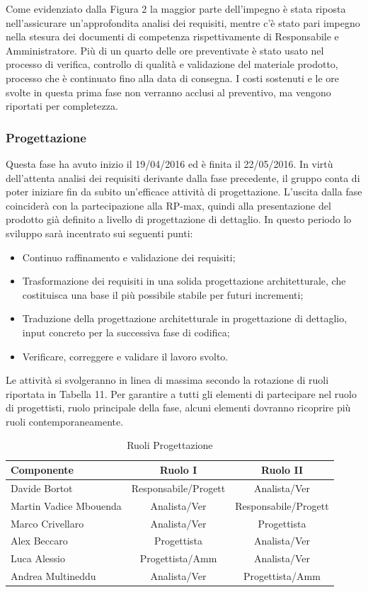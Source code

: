 \documentclass[a4paper,11pt]{article}
\begin{document}
		Come evidenziato dalla Figura 2 la maggior parte dell'impegno è stata riposta nell'assicurare un'approfondita analisi dei requisiti, mentre c'è stato pari impegno nella stesura dei documenti di competenza rispettivamente di Responsabile e Amministratore. Più di un quarto delle ore preventivate è stato usato nel processo di verifica, controllo di qualità e validazione del materiale prodotto, processo che è continuato fino alla data di consegna. I costi sostenuti e le ore svolte in questa prima fase non verranno acclusi al preventivo, ma vengono riportati per completezza.
		\pagebreak
		\subsubsection{Progettazione}
		Questa fase ha avuto inizio il 19/04/2016 ed è finita il 22/05/2016. In virtù dell'attenta analisi dei requisiti derivante dalla fase precedente, il gruppo conta di poter iniziare fin da subito un'efficace attività di progettazione. L'uscita dalla fase coinciderà con la partecipazione alla RP-max, quindi alla presentazione del prodotto già definito a livello di progettazione di dettaglio. In questo periodo lo sviluppo sarà incentrato sui seguenti punti:
		\begin{itemize}
		\item Continuo raffinamento e validazione dei requisiti;
		\item Trasformazione dei requisiti in una solida progettazione architetturale, che costituisca una base il più possibile stabile per futuri incrementi;
		\item Traduzione della progettazione architetturale in progettazione di dettaglio, input concreto per la successiva fase di codifica;
		\item Verificare, correggere e validare il lavoro svolto.
		\end{itemize}
		Le attività si svolgeranno in linea di massima secondo la rotazione di ruoli riportata in Tabella 11. Per garantire a tutti gli elementi di partecipare nel ruolo di progettisti, ruolo principale della fase, alcuni elementi dovranno ricoprire più ruoli contemporaneamente.
		\begin{table}[h!]			
		\begin{center}
			\begin{tabular}{l c c}
			\textbf{Componente} & \textbf{Ruolo I} & \textbf{Ruolo II} \\
			\midrule
			Davide Bortot & Responsabile/Progett & Analista/Ver\\
			Martin Vadice Mbouenda & Analista/Ver & Responsabile/Progett\\
			Marco Crivellaro & Analista/Ver & Progettista\\
			Alex Beccaro & Progettista & Analista/Ver\\
			Luca Alessio & Progettista/Amm & Analista/Ver\\
			Andrea Multineddu & Analista/Ver & Progettista/Amm\\
			\midrule
			\end{tabular}
		\end{center}
		\caption{Ruoli Progettazione}
		\end{table}
		\pagebreak
		
\end{document}
